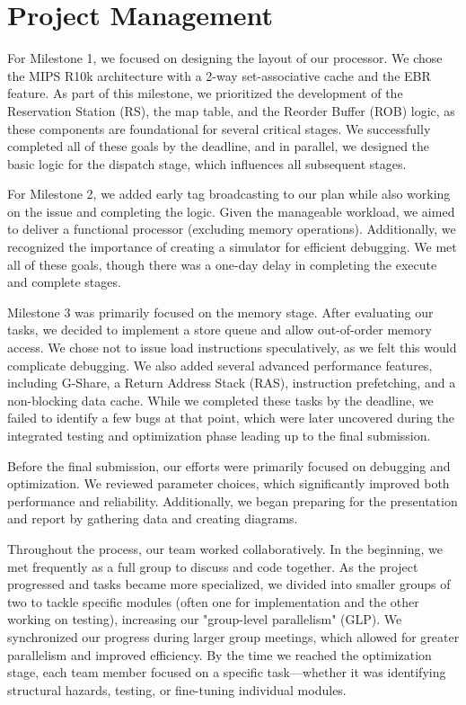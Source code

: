 
\section{Project Management}

For Milestone 1, we focused on designing the layout of our processor. We chose the MIPS R10k architecture with a 2-way set-associative cache and the EBR feature. As part of this milestone, we prioritized the development of the Reservation Station (RS), the map table, and the Reorder Buffer (ROB) logic, as these components are foundational for several critical stages. We successfully completed all of these goals by the deadline, and in parallel, we designed the basic logic for the dispatch stage, which influences all subsequent stages.

For Milestone 2, we added early tag broadcasting to our plan while also working on the issue and completing the logic. Given the manageable workload, we aimed to deliver a functional processor (excluding memory operations). Additionally, we recognized the importance of creating a simulator for efficient debugging. We met all of these goals, though there was a one-day delay in completing the execute and complete stages.

Milestone 3 was primarily focused on the memory stage. After evaluating our tasks, we decided to implement a store queue and allow out-of-order memory access. We chose not to issue load instructions speculatively, as we felt this would complicate debugging. We also added several advanced performance features, including G-Share, a Return Address Stack (RAS), instruction prefetching, and a non-blocking data cache. While we completed these tasks by the deadline, we failed to identify a few bugs at that point, which were later uncovered during the integrated testing and optimization phase leading up to the final submission.

Before the final submission, our efforts were primarily focused on debugging and optimization. We reviewed parameter choices, which significantly improved both performance and reliability. Additionally, we began preparing for the presentation and report by gathering data and creating diagrams.

Throughout the process, our team worked collaboratively. In the beginning, we met frequently as a full group to discuss and code together. As the project progressed and tasks became more specialized, we divided into smaller groups of two to tackle specific modules (often one for implementation and the other working on testing), increasing our "group-level parallelism" (GLP). We synchronized our progress during larger group meetings, which allowed for greater parallelism and improved efficiency. By the time we reached the optimization stage, each team member focused on a specific task—whether it was identifying structural hazards, testing, or fine-tuning individual modules.

